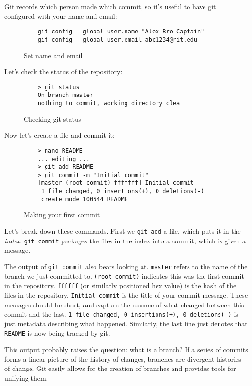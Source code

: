 \documentclass[11pt]{report}
\begin{document}
Git records which person made which commit, so it's useful to have git
configured with your name and email:

\begin{figure}[H]
  \caption{Set name and email}
  \begin{lstlisting}
    git config --global user.name "Alex Bro Captain"
    git config --global user.email abc1234@rit.edu
  \end{lstlisting}
\end{figure}

Let's check the status of the repository:

\begin{figure}[H]
  \caption{Checking git status}
  \begin{lstlisting}
    > git status
    On branch master
    nothing to commit, working directory clea
  \end{lstlisting}
\end{figure}

Now let's create a file and commit it:

\begin{figure}[H]
  \caption{Making your first commit}
  \begin{lstlisting}
    > nano README
    ... editing ...
    > git add README
    > git commit -m "Initial commit"
    [master (root-commit) fffffff] Initial commit
     1 file changed, 0 insertions(+), 0 deletions(-)
     create mode 100644 README
  \end{lstlisting}
\end{figure}

Let's break down these commands. First we \texttt{git add} a file,
which puts it in the \emph{index}. \texttt{git commit} packages the
files in the index into a commit, which is given a message.

The output of \texttt{git commit} also bears looking
at. \texttt{master} refers to the name of the branch we just committed
to. \texttt{(root-commit)} indicates this was the first commit in the
repository. \texttt{ffffff} (or similarly positioned hex value) is the
hash of the files in the repository. \texttt{Initial commit} is the
title of your commit message. These messages should be short, and
capture the essence of what changed between this commit and the
last\cite{gitscm}. \texttt{1 file changed, 0 insertions(+), 0 deletions(-)} is just
metadata describing what happened. Similarly, the last line just
denotes that \texttt{README} is now being tracked by git.

This output probably raises the question: what is a branch?  If a
series of commits forms a linear picture of the history of changes,
branches are divergent histories of change. Git easily allows for the
creation of branches and provides tools for unifying them.
\end{document}
